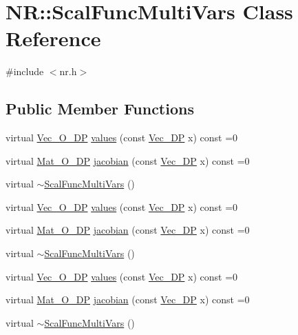 \hypertarget{classNR_1_1ScalFuncMultiVars}{}\section{NR\+:\+:Scal\+Func\+Multi\+Vars Class Reference}
\label{classNR_1_1ScalFuncMultiVars}


{\ttfamily \#include $<$nr.\+h$>$}

\subsection*{Public Member Functions}
\begin{DoxyCompactItemize}
\item 
virtual \mbox{\hyperlink{namespaceNR_a970094d23441f8ef6a45282a7eb2103d}{Vec\+\_\+\+O\+\_\+\+DP}} \mbox{\hyperlink{classNR_1_1ScalFuncMultiVars_a5345ed027a649e71ae8ae3c8dadb436c}{values}} (const \mbox{\hyperlink{namespaceNR_a115a3196718c98e8e2562d80b06c23c5}{Vec\+\_\+\+DP}} x) const =0
\item 
virtual \mbox{\hyperlink{namespaceNR_adc1f8da33094b6bbeb1f5f899515ce54}{Mat\+\_\+\+O\+\_\+\+DP}} \mbox{\hyperlink{classNR_1_1ScalFuncMultiVars_ab8dd80ced0a7b26584bde4e34444c04a}{jacobian}} (const \mbox{\hyperlink{namespaceNR_a115a3196718c98e8e2562d80b06c23c5}{Vec\+\_\+\+DP}} x) const =0
\item 
virtual \mbox{\hyperlink{classNR_1_1ScalFuncMultiVars_a324caa9cf6de53c9eb1f532443030188}{$\sim$\+Scal\+Func\+Multi\+Vars}} ()
\item 
virtual \mbox{\hyperlink{namespaceNR_a970094d23441f8ef6a45282a7eb2103d}{Vec\+\_\+\+O\+\_\+\+DP}} \mbox{\hyperlink{classNR_1_1ScalFuncMultiVars_a5345ed027a649e71ae8ae3c8dadb436c}{values}} (const \mbox{\hyperlink{namespaceNR_a115a3196718c98e8e2562d80b06c23c5}{Vec\+\_\+\+DP}} x) const =0
\item 
virtual \mbox{\hyperlink{namespaceNR_adc1f8da33094b6bbeb1f5f899515ce54}{Mat\+\_\+\+O\+\_\+\+DP}} \mbox{\hyperlink{classNR_1_1ScalFuncMultiVars_ab8dd80ced0a7b26584bde4e34444c04a}{jacobian}} (const \mbox{\hyperlink{namespaceNR_a115a3196718c98e8e2562d80b06c23c5}{Vec\+\_\+\+DP}} x) const =0
\item 
virtual \mbox{\hyperlink{classNR_1_1ScalFuncMultiVars_a324caa9cf6de53c9eb1f532443030188}{$\sim$\+Scal\+Func\+Multi\+Vars}} ()
\item 
virtual \mbox{\hyperlink{namespaceNR_a970094d23441f8ef6a45282a7eb2103d}{Vec\+\_\+\+O\+\_\+\+DP}} \mbox{\hyperlink{classNR_1_1ScalFuncMultiVars_a5345ed027a649e71ae8ae3c8dadb436c}{values}} (const \mbox{\hyperlink{namespaceNR_a115a3196718c98e8e2562d80b06c23c5}{Vec\+\_\+\+DP}} x) const =0
\item 
virtual \mbox{\hyperlink{namespaceNR_adc1f8da33094b6bbeb1f5f899515ce54}{Mat\+\_\+\+O\+\_\+\+DP}} \mbox{\hyperlink{classNR_1_1ScalFuncMultiVars_ab8dd80ced0a7b26584bde4e34444c04a}{jacobian}} (const \mbox{\hyperlink{namespaceNR_a115a3196718c98e8e2562d80b06c23c5}{Vec\+\_\+\+DP}} x) const =0
\item 
virtual \mbox{\hyperlink{classNR_1_1ScalFuncMultiVars_a324caa9cf6de53c9eb1f532443030188}{$\sim$\+Scal\+Func\+Multi\+Vars}} ()
\end{DoxyCompactItemize}



